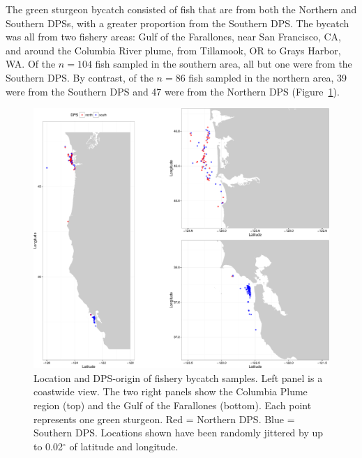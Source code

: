 \documentclass[twocolumn,natbib]{svjour3}       %
\begin{document}
The green sturgeon bycatch consisted of fish that are from both the Northern and
Southern DPSs, with a greater proportion from the Southern DPS. The bycatch was
all from two fishery areas: Gulf of the Farallones, near San Francisco, CA, and around the Columbia River
plume, from Tillamook, OR to Grays Harbor, WA. Of the $n = 104$ fish sampled in the southern
area, all but one were from the Southern DPS.  By contrast, of the $n = 86$ fish sampled in the northern area,
39 were from the Southern DPS and 47 were from the Northern DPS
(Figure~\ref{fig:bycatch-map}).
\begin{figure}
\begin{center}
\includegraphics[width = \textwidth]{bycatch_map-crop.pdf}
\end{center}
\caption{ Location and DPS-origin of fishery bycatch samples. Left panel is a coastwide
view.  The two right panels show the Columbia Plume region (top) and the 
Gulf of the Farallones (bottom).  Each point represents one green sturgeon.  Red = Northern DPS. 
Blue = Southern DPS. Locations shown have been randomly jittered by up to 0.02$^\circ$ of latitude and longitude.}
\label{fig:bycatch-map}
\end{figure}
\end{document}
